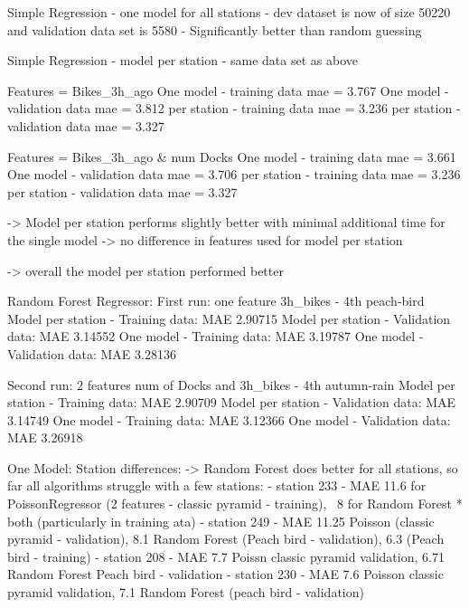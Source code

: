 \documentclass{article}
\begin{document}
{{{{{{{        Simple Regression - one model for all stations
        - dev dataset is now of size 50220 and validation data set is 5580
        - Significantly better than random guessing

        Simple Regression - model per station
        - same data set as above

            Features = Bikes_3h_ago
            One model - training data mae = 3.767
            One model - validation data mae = 3.812
            per station - training data mae = 3.236
            per station - validation data mae = 3.327

            Features = Bikes_3h_ago & num Docks
            One model - training data mae = 3.661
            One model - validation data mae = 3.706
            per station - training data mae = 3.236
            per station - validation data mae = 3.327

        -> Model per station performs slightly better with minimal additional time for the single model
        -> no difference in features used for model per station

        -> overall the model per station performed better

        Random Forest Regressor:
        First run: one feature 3h_bikes - 4th peach-bird
        Model per station - Training data: MAE 2.90715
        Model per station - Validation data: MAE 3.14552
        One model - Training data: MAE 3.19787
        One model - Validation data: MAE 3.28136

        Second run: 2 features num of Docks and 3h_bikes - 4th autumn-rain
        Model per station - Training data: MAE 2.90709
        Model per station - Validation data: MAE 3.14749
        One model - Training data: MAE 3.12366
        One model - Validation data: MAE 3.26918

        One Model:
        Station differences:
        -> Random Forest does better for all stations, so far all algorithms struggle with a few stations:
        - station 233 - MAE 11.6 for PoissonRegressor (2 features - classic pyramid - training), ~8 for Random Forest * both (particularly in training ata)
        - station 249 - MAE 11.25 Poisson (classic pyramid - validation), 8.1 Random Forest (Peach bird - validation),
                        6.3 (Peach  bird - training)
        - station 208 - MAE 7.7 Poissn classic pyramid validation, 6.71 Random Forest Peach bird - validation
        - station 230 - MAE 7.6 Poisson classic pyramid validation, 7.1 Random Forest (peach bird - validation)

}}}}}}}
\end{document}
